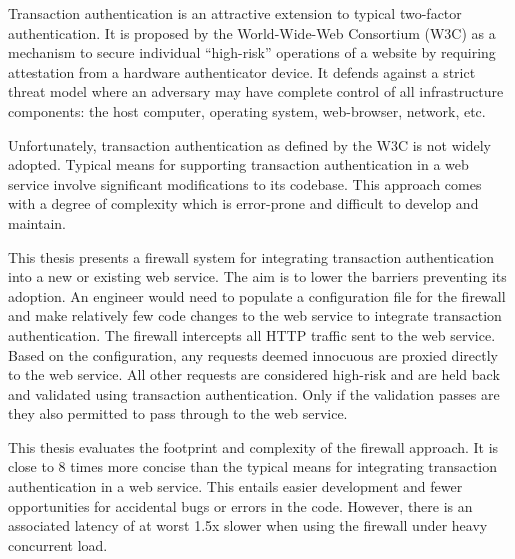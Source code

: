 % 
% 
%
Transaction authentication is an attractive extension to typical two-factor authentication. It is proposed by the World-Wide-Web Consortium (W3C) as a mechanism to secure individual ``high-risk'' operations of a website by requiring attestation from a hardware authenticator device. It defends against a strict threat model where an adversary may have complete control of all infrastructure components: the host computer, operating system, web-browser, network, etc. 

Unfortunately, transaction authentication as defined by the W3C is not widely adopted. Typical means for supporting transaction authentication in a web service involve significant modifications to its codebase. This approach comes with a degree of complexity which is error-prone and difficult to develop and maintain.


This thesis presents a firewall system for integrating transaction authentication into a new or existing web service. The aim is to lower the barriers preventing its adoption. An engineer would need to populate a configuration file for the firewall and make relatively few code changes to the web service to integrate transaction authentication. The firewall intercepts all HTTP traffic sent to the web service. Based on the configuration, any requests deemed innocuous are proxied directly to the web service. All other requests are considered high-risk and are held back and validated using transaction authentication. Only if the validation passes are they also permitted to pass through to the web service.

This thesis evaluates the footprint and complexity of the firewall approach. It is close to 8 times more concise than the typical means for integrating transaction authentication in a web service. This entails easier development and fewer opportunities for accidental bugs or errors in the code. However, there is an associated latency of at worst 1.5x slower when using the firewall under heavy concurrent load.
